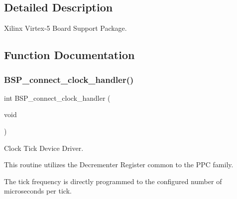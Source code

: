 \subsection{Detailed Description}
Xilinx Virtex-\/5 Board Support Package. 



\subsection{Function Documentation}
\mbox{\label{group__RTEMSBSPsPowerPCVirtex5_ga7e99fec6e3bd9986094a2de9cc0b110a}} 
\subsubsection{\texorpdfstring{BSP\_connect\_clock\_handler()}{BSP\_connect\_clock\_handler()}}
{\footnotesize\ttfamily int B\+S\+P\+\_\+connect\+\_\+clock\+\_\+handler (\begin{DoxyParamCaption}\item[{void}]{ }\end{DoxyParamCaption})}



Clock Tick Device Driver. 

This routine utilizes the Decrementer Register common to the P\+PC family.

The tick frequency is directly programmed to the configured number of microseconds per tick. 